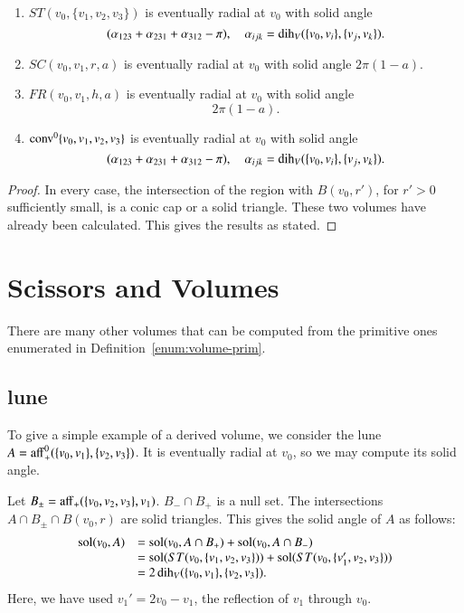 \begin{lemma} \label{lemma:prim-sol}
\begin{enumerate}
    \item  $ST(v_0,\{v_1,v_2,v_3\})$ is eventually radial at $v_0$
     with solid angle 
     $$
     (\alpha_{123}+\alpha_{231}+\alpha_{312}-\pi),\quad
     \alpha_{ijk}=\operatorname{dih}_V(\{v_0,v_i\},\{v_j,v_k\}).
     $$
    \item $SC(v_0,v_1,r,a)$ is eventually radial at $v_0$ with solid
      angle 
      $2\pi(1-a)$.
    \item $FR(v_0,v_1,h,a)$ is eventually radial at $v_0$ with solid
      angle
        $$
        2\pi (1-a).
        $$
    \item ${\operatorname{conv}}^0\{v_0,v_1,v_2,v_3\}$ is eventually radial at $v_0$
      with solid angle
           $$
     (\alpha_{123}+\alpha_{231}+\alpha_{312}-\pi),\quad
     \alpha_{ijk}=\operatorname{dih}_V(\{v_0,v_i\},\{v_j,v_k\}).
     $$
\end{enumerate}
\end{lemma}

\begin{proof} In every case, the intersection of 
  the region with $B(v_0,r')$, for $r'>0$ sufficiently small, is
  a conic cap or a solid triangle.  These two volumes have
  already been calculated.  This gives the results as stated.
\end{proof}

\section{Scissors and Volumes}
\label{sec:measure_second}

There are many other volumes that can be computed from the
primitive ones enumerated in Definition~\ref{enum:volume-prim}.

\subsection{lune}  

To give a simple example of a derived volume, we consider the
lune $A={\operatorname{aff}}_+^0(\{v_0,v_1\},\{v_2,v_3\})$.  It is eventually
radial at $v_0$, so we may compute its solid angle.

Let $B_{\pm} = {\operatorname{aff}}_+(\{v_0,v_2,v_3\},v_1)$.  $B_- \cap B_+$
is a null set.  The intersections $A\cap B_{\pm}\cap B(v_0,r)$ 
are solid triangles.  This gives the solid angle of $A$ as
follows:
   $$\begin{array}{lll}
   \operatorname{sol}(v_0,A) &= \operatorname{sol}(v_0,A\cap B_+)+\operatorname{sol}(v_0,A\cap B_-) \\
   &= 
   \operatorname{sol}(ST(v_0,\{v_1,v_2,v_3\})) + \operatorname{sol}(ST(v_0,\{v_1',v_2,v_3\})) \\
   &=
   2\operatorname{dih}_V(\{v_0,v_1\},\{v_2,v_3\}).
   \end{array}
   $$
Here, we have used $v_1'= 2 v_0 - v_1$, the reflection of $v_1$
through $v_0$.    

